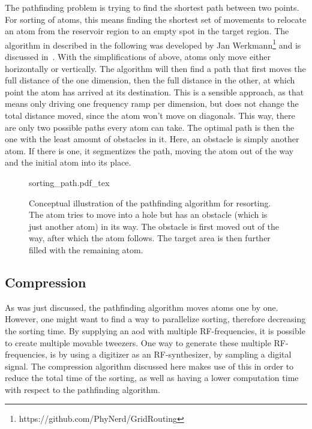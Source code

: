 The pathfinding problem is trying to find the shortest path between two points. For sorting of atoms, this means finding the shortest set of movements to relocate an atom from the reservoir region to an empty spot in the target region.
The algorithm in described in the following was developed by Jan Werkmann\footnote{https://github.com/PhyNerd/GridRouting} and is discussed in~\cite{OhldeMello2020}. With the simplifications of above, atoms only move either horizontally or vertically. The algorithm will then find a path that first moves the full distance of the one dimension, then the full distance in the other, at which point the atom has arrived at its destination. This is a sensible approach, as that means only driving one frequency ramp per dimension, but does not change the total distance moved, since the atom won't move on diagonals.
This way, there are only two possible paths every atom can take. The optimal path is then the one with the least amount of obstacles in it. Here, an obstacle is simply another atom. If there is one, it segmentizes the path, moving the atom out of the way and the initial atom into its place.

\begin{figure}[ht]%
\label{fig:sorting_path}
\centering
	{sorting_path.pdf_tex}
	\caption{Conceptual illustration of the pathfinding algorithm for resorting. The atom tries to move into a hole but has an obstacle (which is just another atom) in its way. The obstacle is first moved out of the way, after which the atom follows. The target area is then further filled with the remaining atom.}
\end{figure}

\subsection{Compression}%
\label{sec:compression}

As was just discussed, the pathfinding algorithm moves atoms one by one. However, one might want to find a way to parallelize sorting, therefore decreasing the sorting time. By supplying an \ac{aod} with multiple RF-frequencies, it is possible to create multiple movable tweezers. One way to generate these multiple RF-frequencies, is by using a digitizer as an RF-synthesizer, by sampling a digital signal. The compression algorithm discussed here makes use of this in order to reduce the total time of the sorting, as well as having a lower computation time with respect to the pathfinding algorithm.

